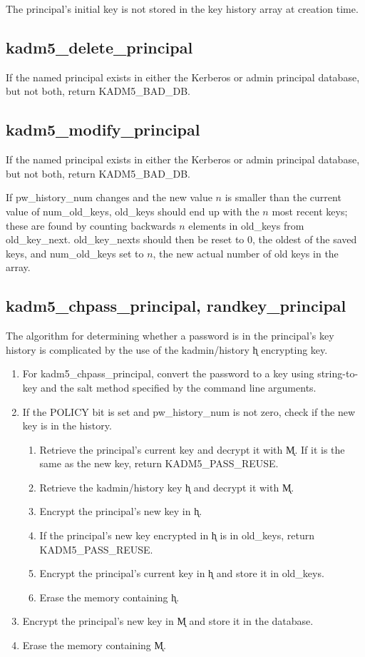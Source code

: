 The principal's initial key is not stored in the key history array at
creation time.

\subsection{kadm5_delete_principal}

If the named principal exists in either the Kerberos or admin
principal database, but not both, return KADM5_BAD_DB.

\subsection{kadm5_modify_principal}

If the named principal exists in either the Kerberos or admin
principal database, but not both, return KADM5_BAD_DB.

If pw_history_num changes and the new value $n$ is smaller than the
current value of num_old_keys, old_keys should end up with the $n$
most recent keys; these are found by counting backwards $n$ elements
in old_keys from old_key_next.  old_key_nexts should then be reset to
0, the oldest of the saved keys, and num_old_keys set to $n$, the
new actual number of old keys in the array.

\subsection{kadm5_chpass_principal, randkey_principal}

The algorithm for determining whether a password is in the principal's
key history is complicated by the use of the kadmin/history \k{h}
encrypting key.

\begin{enumerate}
\item For kadm5_chpass_principal, convert the password to a key
using string-to-key and the salt method specified by the command line
arguments.

\item If the POLICY bit is set and pw_history_num is not zero, check
if the new key is in the history.
\begin{enumerate}
\item Retrieve the principal's current key and decrypt it with \k{M}.
If it is the same as the new key, return KADM5_PASS_REUSE.
\item Retrieve the kadmin/history key \k{h} and decrypt it with \k{M}.
\item Encrypt the principal's new key in \k{h}.
\item If the principal's new key encrypted in \k{h} is in old_keys,
return KADM5_PASS_REUSE.
\item Encrypt the principal's current key in \k{h} and store it in
old_keys.
\item Erase the memory containing \k{h}.
\end{enumerate}

\item Encrypt the principal's new key in \k{M} and store it in the
database.
\item Erase the memory containing \k{M}.
\end{enumerate}


